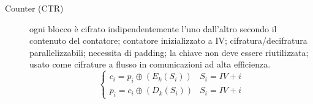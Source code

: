 \begin{description}
  \item[Counter (CTR)] ogni blocco è cifrato indipendentemente l'uno dall'altro secondo il contenuto del contatore; contatore inizializzato a IV; cifratura/decifratura parallelizzabili; necessita di padding; la chiave non deve essere riutilizzata; usato come cifrature a flusso in comunicazioni ad alta efficienza.
  $$
  \begin{cases}
    c_{i}=p_{i} \oplus (E_{k}(S_{i})) & S_{i}=IV+i\\
    p_{i}=c_{i} \oplus (D_{k}(S_{i})) & S_{i}=IV+i
  \end{cases}
  $$

\end{description}
